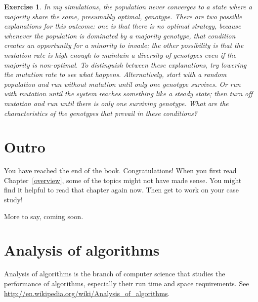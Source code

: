 \documentclass[12pt]{book}
\theoremstyle{exercise}
\newtheorem{exercise}{Exercise}[chapter]
\begin{document}
\begin{exercise}

In my simulations, the population never converges to a state where a majority share the same, presumably optimal, genotype. There are two possible explanations for this outcome: one is that there is no optimal strategy, because whenever the population is dominated by a majority genotype, that condition creates an opportunity for a minority to invade; the other possibility is that the mutation rate is high enough to maintain a diversity of genotypes even if the majority is non-optimal. To distinguish between these explanations, try lowering the mutation rate to see what happens. Alternatively, start with a random population and run without mutation until only one genotype survives. Or run with mutation until the system reaches something like a steady state; then turn off mutation and run until there is only one surviving genotype. What are the characteristics of the genotypes that prevail in these conditions?

\end{exercise}






\chapter{Outro}

You have reached the end of the book.  Congratulations!  When you
first read Chapter~\ref{overview}, some of the topics might not have
made sense.  You might find it helpful to read that chapter again now.
Then get to work on your case study!

More to say, coming soon.





\appendix

\chapter{Analysis of algorithms}
\label{algorithms}

Analysis of algorithms is the branch of computer science that studies
the performance of algorithms, especially their run time and space
requirements.  See \url{http://en.wikipedia.org/wiki/Analysis_of_algorithms}.
\end{document}
